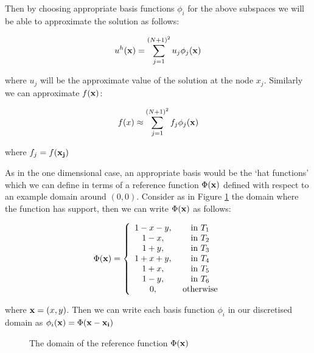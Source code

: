 Then by choosing appropriate basis functions $\phi_i$ for the above subspaces
we will be able to approximate the solution as follows:

\begin{equation}
    u^h(\mathbf{x}) = \sum_{j=1}^{(N+1)^2}u_j\phi_j(\mathbf{x})
\end{equation}

where $u_j$ will be the approximate value of the solution at the node $x_j$.
Similarly we can approximate $f(\mathbf{x})$:

\begin{equation}
    f(x) \approx \sum_{j=1}^{(N+1)^2}f_j\phi_j(\mathbf{x})
\end{equation}

where $f_j = f(\mathbf{x_j})$


As in the one dimensional case, an appropriate basis would be the `hat
functions' which we can define in terms of a reference function $\Phi(\mathbf{x})$
defined with respect to an example domain around $(0,0)$.  Consider as in
Figure \ref{fig:reference-function-domain} the domain where the function has
support, then we can write $\Phi(\mathbf{x})$ as follows:

\begin{equation}\label{eq:two-d-ref-basis-fn}
    \Phi(\mathbf{x}) = \left\{\begin{array}{c c}
                    1 - x - y, & \text{ in } T_1 \\
                    1 - x,       & \text{ in } T_2 \\
                    1 + y,       & \text{ in } T_3 \\
                    1 + x + y,   & \text{ in } T_4 \\
                    1 + x,       & \text{ in } T_5 \\
                    1 - y,       & \text{ in } T_6 \\
                    0,           & \text{ otherwise}
                  \end{array}\right.
\end{equation}

where $\mathbf{x} = (x, y)$. Then we can write each basis function $\phi_i$ in our
discretised domain as $\phi_i(\mathbf{x}) = \Phi(\mathbf{x} - \mathbf{x_i})$

\begin{figure}
\centering

\caption{The domain of the reference function $\Phi(\mathbf{x})$}
\label{fig:reference-function-domain}
\end{figure}

